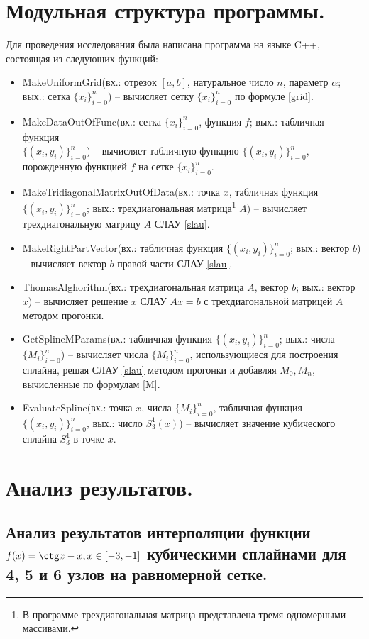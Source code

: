 \documentclass[a4paper, 12pt]{article}
\begin{document}
	\section{Модульная структура программы.}
	Для проведения исследования была написана программа на языке C++, состоящая из следующих функций:
	\begin{itemize}
		\item MakeUniformGrid(вх.: отрезок $[a,b]$, натуральное число $n$, параметр $\alpha$; вых.: сетка $\{x_i\}_{i=0}^n$) -- вычисляет сетку $\{x_i\}_{i=0}^n$ по формуле \eqref{grid}.
		\item MakeDataOutOfFunc(вх.: сетка $\{x_i\}_{i=0}^n$, функция $f$; вых.: табличная функция \\ $\{(x_i,y_i)\}_{i=0}^n$) -- вычисляет табличную функцию $\{(x_i,y_i)\}_{i=0}^n$, порожденную функцией $f$ на сетке $\{x_i\}_{i=0}^n$.
		\item MakeTridiagonalMatrixOutOfData(вх.: точка $x$, табличная функция $\{(x_i,y_i)\}_{i=0}^n$; вых.: трехдиагональная матрица\footnote{В программе трехдиагональная матрица представлена тремя одномерными массивами.} $A$) -- вычисляет трехдиагональную матрицу $A$ СЛАУ \eqref{slau}.
		\item MakeRightPartVector(вх.: табличная функция $\{(x_i,y_i)\}_{i=0}^n$; вых.: вектор $b$) -- вычисляет вектор $b$ правой части СЛАУ \eqref{slau}.
		\item ThomasAlghorithm(вх.: трехдиагональная матрица $A$, вектор $b$; вых.: вектор $x$) -- вычисляет решение $x$ СЛАУ $Ax=b$ с трехдиагональной матрицей $A$ методом прогонки.
		\item GetSplineMParams(вх.: табличная функция $\{(x_i,y_i)\}_{i=0}^n$; вых.: числа $\{M_i\}_{i=0}^n$) -- вычисляет числа $\{M_i\}_{i=0}^n$, использующиеся для построения сплайна, решая СЛАУ \eqref{slau} методом прогонки и добавляя $M_0,M_n$, вычисленные по формулам \eqref{M}.
		\item EvaluateSpline(вх.: точка $x$, числа $\{M_i\}_{i=0}^n$, табличная функция $\{(x_i,y_i)\}_{i=0}^n$, вых.: число $S_3^1(x)$) -- вычисляет значение кубического сплайна $S_3^1$ в точке $x$.
	\end{itemize}
	
	\section{Анализ результатов.}
	
	\subsection{Анализ результатов интерполяции функции $f(x)=\ctg x-x, x\in[-3,-1]$ кубическими сплайнами для 4, 5 и 6 узлов на равномерной сетке.} 
	
\end{document}
